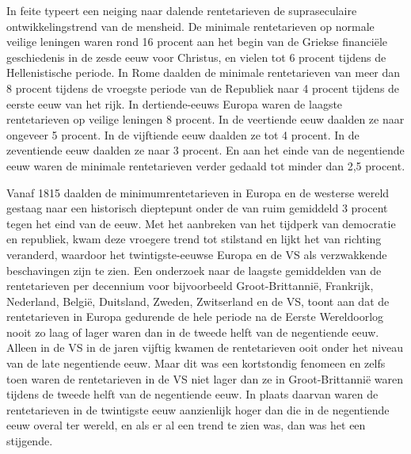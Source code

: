 \begin{blockquotebox}
    In feite typeert een neiging naar dalende rentetarieven de supraseculaire ontwikkelingstrend van de mensheid. De minimale rentetarieven op \textquotesingle normale veilige leningen\textquotesingle{} waren rond 16 procent aan het begin van de Griekse financiële geschiedenis in de zesde eeuw voor Christus, en vielen tot 6 procent tijdens de Hellenistische periode. In Rome daalden de minimale rentetarieven van meer dan 8 procent tijdens de vroegste periode van de Republiek naar 4 procent tijdens de eerste eeuw van het rijk. In dertiende-eeuws Europa waren de laagste rentetarieven op \textquotesingle veilige\textquotesingle{} leningen 8 procent. In de veertiende eeuw daalden ze naar ongeveer 5 procent. In de vijftiende eeuw daalden ze tot 4 procent. In de zeventiende eeuw daalden ze naar 3 procent. En aan het einde van de negentiende eeuw waren de minimale rentetarieven verder gedaald tot minder dan 2,5 procent.
    \par\vspace{1em}\noindent
    Vanaf 1815 daalden de minimumrentetarieven in Europa en de westerse wereld gestaag naar een historisch dieptepunt onder de van ruim gemiddeld 3 procent tegen het eind van de eeuw. Met het aanbreken van het tijdperk van democratie en republiek, kwam deze vroegere trend tot stilstand en lijkt het van richting veranderd, waardoor het twintigste-eeuwse Europa en de VS als verzwakkende beschavingen zijn te zien. Een onderzoek naar de laagste gemiddelden van de rentetarieven per decennium voor bijvoorbeeld Groot-Brittannië, Frankrijk, Nederland, België, Duitsland, Zweden, Zwitserland en de VS, toont aan dat de rentetarieven in Europa gedurende de hele periode na de Eerste Wereldoorlog nooit zo laag of lager waren dan in de tweede helft van de negentiende eeuw. Alleen in de VS in de jaren vijftig kwamen de rentetarieven ooit onder het niveau van de late negentiende eeuw. Maar dit was een kortstondig fenomeen en zelfs toen waren de rentetarieven in de VS niet lager dan ze in Groot-Brittannië waren tijdens de tweede helft van de negentiende eeuw. In plaats daarvan waren de rentetarieven in de twintigste eeuw aanzienlijk hoger dan die in de negentiende eeuw overal ter wereld, en als er al een trend te zien was, dan was het een stijgende.\footnotemark
\end{blockquotebox}

